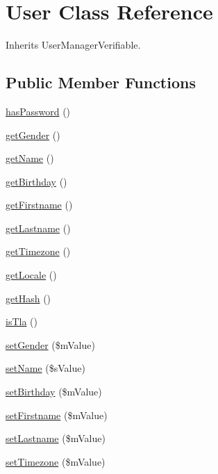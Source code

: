 \hypertarget{class_user}{\section{User Class Reference}
\label{class_user}
}


Inherits User\-Manager\-Verifiable.

\subsection*{Public Member Functions}
\begin{DoxyCompactItemize}
\item 
\hyperlink{class_user_a3e42270f74c053e9646abfaf3aff6795}{has\-Password} ()
\item 
\hyperlink{class_user_a37936056e5dafdc7f83538ba873366ae}{get\-Gender} ()
\item 
\hyperlink{class_user_a0b41f2ef1838507911322bf4107f44ac}{get\-Name} ()
\item 
\hyperlink{class_user_aa6ebef928782929f9bb598cbdeb3cdb0}{get\-Birthday} ()
\item 
\hyperlink{class_user_a8b64c48534a48f71b42c046e42739234}{get\-Firstname} ()
\item 
\hyperlink{class_user_a17bba25fe56153018b46277eda91093b}{get\-Lastname} ()
\item 
\hyperlink{class_user_ac14238186e330ea1a9e1b351d59321c7}{get\-Timezone} ()
\item 
\hyperlink{class_user_a1eba0bba98102d4d66c10c0bf2f1ac34}{get\-Locale} ()
\item 
\hyperlink{class_user_a90d1a1e4f8b768416e10595348e169d3}{get\-Hash} ()
\item 
\hyperlink{class_user_aa9d450d2bfba79d4ef3e838ed4becc0d}{is\-Tla} ()
\item 
\hyperlink{class_user_a29149cc15a68be01d23a6fd86eb7ed35}{set\-Gender} (\$m\-Value)
\item 
\hyperlink{class_user_a311fc78208c715aaead2219e5fea8eca}{set\-Name} (\$s\-Value)
\item 
\hyperlink{class_user_abc390b3ad58404e947d0f1f860159514}{set\-Birthday} (\$m\-Value)
\item 
\hyperlink{class_user_a7f5656a5802eeac1bf09c894a0183e24}{set\-Firstname} (\$m\-Value)
\item 
\hyperlink{class_user_adbe721c5e2272cb917dc33efa79c3d4d}{set\-Lastname} (\$m\-Value)
\item 
\hyperlink{class_user_af34ee282a3bd3add95b62bffe2d232c1}{set\-Timezone} (\$m\-Value)

\end{DoxyCompactItemize}
